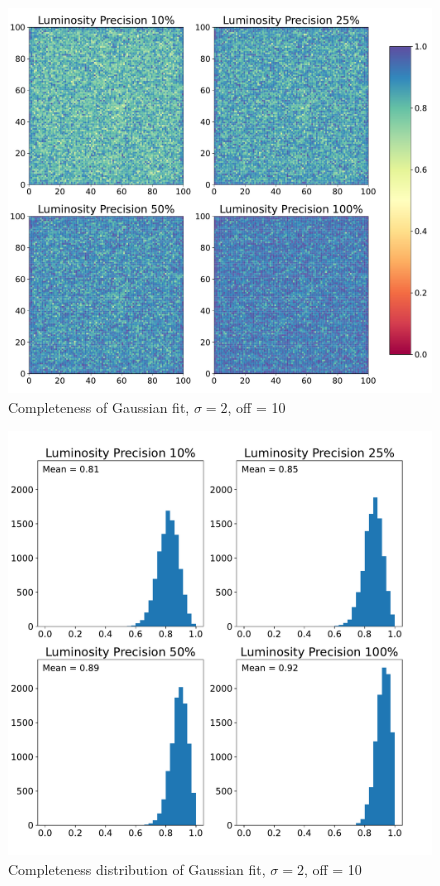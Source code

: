 \documentclass[a4paper]{article}
\begin{document}
		\newpage
		\begin{figure}[h!]
			\centering
			\includegraphics[height=0.4\textheight]{backgauss2_boards_gauss.pdf}
			\caption{Completeness of Gaussian fit, $\sigma = 2$, off = 10}
			\label{fig:bbg}
		\end{figure}
		\begin{figure}[h!]
			\centering
			\includegraphics[height=0.4\textheight]{backgauss2_hists_gauss.pdf}
			\caption{Completeness distribution of Gaussian fit, $\sigma = 2$, off = 10}
			\label{fig:bhg}
		\end{figure}
\end{document}
